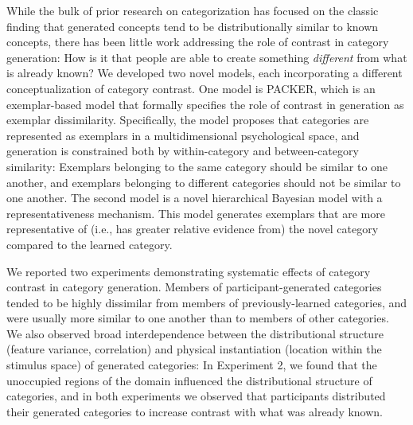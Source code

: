 \documentclass[12pt]{article}
\begin{document}
\begin{flushleft}
While the bulk of prior research on categorization has focused on the classic
finding that generated concepts tend to be distributionally similar to known
concepts, there has been little work addressing the role of contrast in category
generation: How is it that people are able to create something {\em different}
from what is already known? We developed two novel models, each incorporating a
different conceptualization of category contrast. One model is PACKER, which is
an exemplar-based model that formally specifies the role of contrast in
generation as exemplar dissimilarity. Specifically, the model proposes that
categories are represented as exemplars in a multidimensional psychological
space, and generation is constrained both by within-category and
between-category similarity: Exemplars belonging to the same category should be
similar to one another, and exemplars belonging to different categories should
not be similar to one another. The second model is a novel hierarchical Bayesian
model with a representativeness mechanism. This model generates exemplars that
are more representative of (i.e., has greater relative evidence from) the novel
category compared to the learned category.

We reported two experiments demonstrating systematic effects of category
contrast in category generation. Members of participant-generated categories
tended to be highly dissimilar from members of previously-learned categories,
and were usually more similar to one another than to members of other
categories. We also observed broad interdependence between the distributional
structure (feature variance, correlation) and physical instantiation (location
within the stimulus space) of generated categories: In Experiment 2, we found
that the unoccupied regions of the domain influenced the distributional
structure of categories, and in both experiments we observed that participants
distributed their generated categories to increase contrast with what was
already known.


\end{flushleft}
\end{document}
